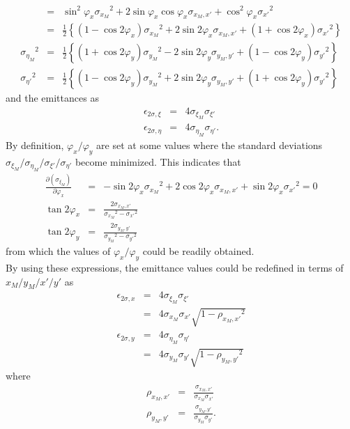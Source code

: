 \documentclass{article}
\begin{document}
\begin{eqnarray*}
& = & \sin^2{\varphi_x} {\sigma_{x_M}}^2 +2\sin{\varphi_x}\cos{\varphi_x} \sigma_{x_M,x'} + \cos^2{\varphi_x} {\sigma_{x'}}^2 \\
& = & \frac{1}{2} \left\{ \left(1-\cos{2\varphi_x}\right) {\sigma_{x_M}}^2 + 2\sin{2\varphi_x}\sigma_{x_M,x'} + \left(1+\cos{2\varphi_x}\right) {\sigma_{x'}}^2 \right\} \\
{\sigma_{\eta_M}}^2 & = & \frac{1}{2} \left\{ \left(1+\cos{2\varphi_y}\right) {\sigma_{y_M}}^2 - 2\sin{2\varphi_y}\sigma_{y_M,y'} + \left(1-\cos{2\varphi_y}\right) {\sigma_{y'}}^2 \right\} \\
{\sigma_{\eta'}}^2 & = & \frac{1}{2} \left\{ \left(1-\cos{2\varphi_y}\right) {\sigma_{y_M}}^2 + 2\sin{2\varphi_y}\sigma_{y_M,y'} + \left(1+\cos{2\varphi_y}\right) {\sigma_{y'}}^2 \right\}
\end{eqnarray*}
and the emittances as
\begin{eqnarray*}
\epsilon_{2\sigma,\xi} & = & 4\sigma_{\xi_M}\sigma_{\xi'} \\
\epsilon_{2\sigma,\eta} & = & 4\sigma_{\eta_M}\sigma_{\eta'}.
\end{eqnarray*}
By definition, $\varphi_x/\varphi_y$ are set at some values where the standard deviations $\sigma_{\xi_M}/\sigma_{\eta_M}/\sigma_{\xi'}/\sigma_{\eta'}$ become minimized. This indicates that
\begin{eqnarray*}
\frac{\partial \left({\sigma_{\xi_M}}\right)}{\partial \varphi_x} & = & -\sin{2\varphi_x}{\sigma_{x_M}}^2  + 2\cos{2\varphi_x}\sigma_{x_M,x'} + \sin{2\varphi_x}{\sigma_{x'}}^2 = 0 \\
\tan{2\varphi_x} & = & \frac{2\sigma_{x_M,x'}}{{\sigma_{x_M}}^2 - {\sigma_{x'}}^2} \\
\tan{2\varphi_y} & = & \frac{2\sigma_{y_M,y'}}{{\sigma_{y_M}}^2 - {\sigma_{y'}}^2}
\end{eqnarray*}
from which the values of $\varphi_x/\varphi_y$ could be readily obtained.\\

By using these expressions, the emittance values could be redefined in terms of $x_M/y_M/x'/y'$ as
\begin{eqnarray*}
\epsilon_{2\sigma,x} & = & 4\sigma_{\xi_M}\sigma_{\xi'} \\
& = & 4\sigma_{x_M}\sigma_{x'} \sqrt{1 - {\rho_{x_M,x'}}^2} \\
\epsilon_{2\sigma,y} & = & 4\sigma_{\eta_M}\sigma_{\eta'} \\
& = & 4\sigma_{y_M}\sigma_{y'} \sqrt{1 - {\rho_{y_M,y'}}^2}
\end{eqnarray*}
where
\begin{eqnarray*}
\rho_{x_M,x'} & = & \frac{\sigma_{x_M,x'}}{\sigma_{x_M}\sigma_{x'}} \\
\rho_{y_M,y'} & = & \frac{\sigma_{y_M,y'}}{\sigma_{y_M}\sigma_{y'}} . \\
\end{eqnarray*}
\end{document}
